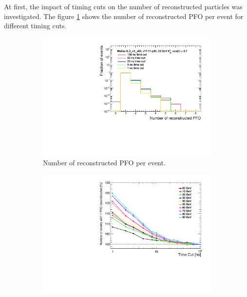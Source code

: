 At first, the impact of timing cuts on the number of reconstructed particles was investigated. The figure \ref{fig:DistriPFO} shows the number of reconstructed PFO per event for different timing cuts.

\begin{figure}[htbp!]
  \centering
  \begin{subfigure}[t]{0.49\textwidth}
    \centering
    \includegraphics[width=1\linewidth]{../Thesis_Plots/ILD/AdditionalPlots/Plots/NumberReconstructedPFO_TimeCuts_50GeV}
    \caption{Number of reconstructed PFO per event.} \label{fig:DistriPFO}
  \end{subfigure}
  \begin{subfigure}[t]{0.49\textwidth}
    \centering
    \includegraphics[width=1\linewidth]{../Thesis_Plots/ILD/NoSmearing/Plots/NumberEvents_PFO_TimeCuts_noSmearing}

\end{subfigure}
\end{figure}
